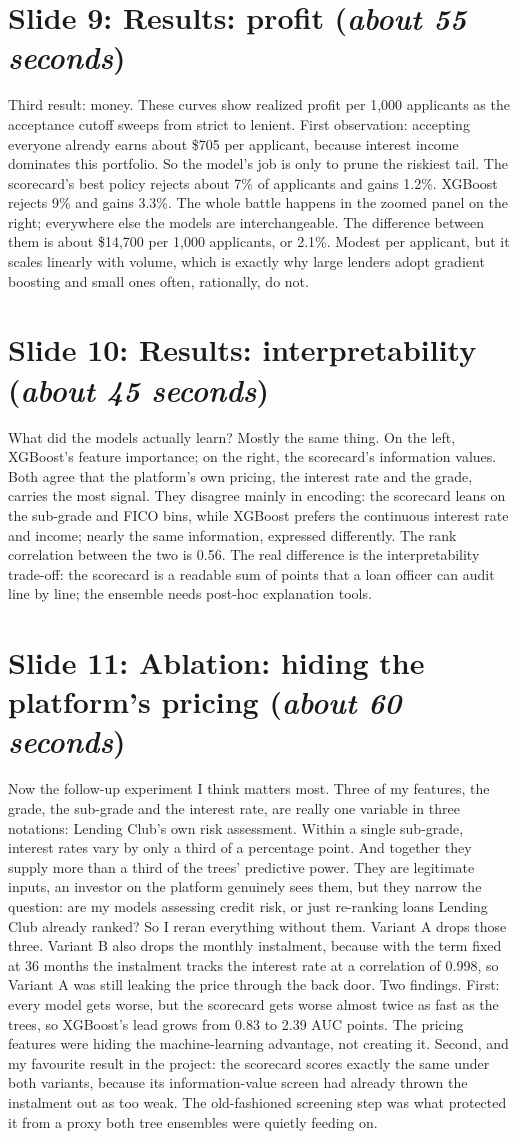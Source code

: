\documentclass[a4paper,11pt]{article}
\newcommand{\slideblock}[3]{%
  \section*{Slide #1: #2 \hfill \normalfont\small(\textit{#3})}}
\begin{document}
\slideblock{9}{Results: profit}{about 55 seconds}
Third result: money. These curves show realized profit per 1,000 applicants as the acceptance cutoff sweeps from strict to lenient. First observation: accepting everyone already earns about \$705 per applicant, because interest income dominates this portfolio. So the model's job is only to prune the riskiest tail. The scorecard's best policy rejects about 7\% of applicants and gains 1.2\%. XGBoost rejects 9\% and gains 3.3\%. The whole battle happens in the zoomed panel on the right; everywhere else the models are interchangeable. The difference between them is about \$14,700 per 1,000 applicants, or 2.1\%. Modest per applicant, but it scales linearly with volume, which is exactly why large lenders adopt gradient boosting and small ones often, rationally, do not.

\slideblock{10}{Results: interpretability}{about 45 seconds}
What did the models actually learn? Mostly the same thing. On the left, XGBoost's feature importance; on the right, the scorecard's information values. Both agree that the platform's own pricing, the interest rate and the grade, carries the most signal. They disagree mainly in encoding: the scorecard leans on the sub-grade and FICO bins, while XGBoost prefers the continuous interest rate and income; nearly the same information, expressed differently. The rank correlation between the two is 0.56. The real difference is the interpretability trade-off: the scorecard is a readable sum of points that a loan officer can audit line by line; the ensemble needs post-hoc explanation tools.

\slideblock{11}{Ablation: hiding the platform's pricing}{about 60 seconds}
Now the follow-up experiment I think matters most. Three of my features, the grade, the sub-grade and the interest rate, are really one variable in three notations: Lending Club's own risk assessment. Within a single sub-grade, interest rates vary by only a third of a percentage point. And together they supply more than a third of the trees' predictive power. They are legitimate inputs, an investor on the platform genuinely sees them, but they narrow the question: are my models assessing credit risk, or just re-ranking loans Lending Club already ranked? So I reran everything without them. Variant A drops those three. Variant B also drops the monthly instalment, because with the term fixed at 36 months the instalment tracks the interest rate at a correlation of 0.998, so Variant A was still leaking the price through the back door. Two findings. First: every model gets worse, but the scorecard gets worse almost twice as fast as the trees, so XGBoost's lead grows from 0.83 to 2.39 AUC points. The pricing features were hiding the machine-learning advantage, not creating it. Second, and my favourite result in the project: the scorecard scores exactly the same under both variants, because its information-value screen had already thrown the instalment out as too weak. The old-fashioned screening step was what protected it from a proxy both tree ensembles were quietly feeding on.
\end{document}
